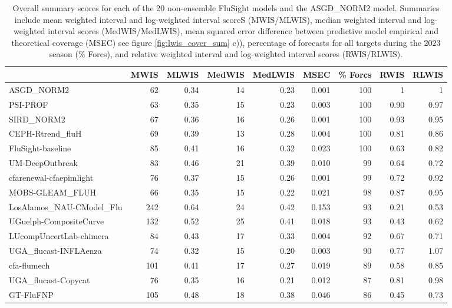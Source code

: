 \begin{table}[ht]
\centering
\begin{adjustwidth}{-3cm}{-1.5cm}
\caption{Overall summary scores for each of the 20 non-ensemble FluSight
models and the ASGD\_NORM2 model. Summaries include mean weighted interval
and log-weighted interval scoreS (MWIS/MLWIS), 
median weighted interval and log-weighted interval scores (MedWIS/MedLWIS), 
mean squared error
difference between predictive model empirical and theoretical coverage (MSEC)
see figure \ref{fig:lwis_cover_sum} c)), percentage of forecasts for all 
targets during the 2023 season (\% Forcs), and relative weighted interval
and log-weighted interval scores (RWIS/RLWIS).}
\begin{tabular}{lrrrrrrrr}
 & MWIS & MLWIS & MedWIS & MedLWIS & MSEC & \% Forcs & RWIS & RLWIS\\ 
  \hline
ASGD\_NORM2 & 62 & 0.34 & 14 & 0.23 & 0.001 & 100 & 1 & 1 \\ 
  PSI-PROF & 63 & 0.35 & 15 & 0.23 & 0.003 & 100 & 0.90 & 0.97 \\ 
  SIRD\_NORM2 & 67 & 0.36 & 16 & 0.26 & 0.001 & 100 & 0.93 & 0.95 \\
  CEPH-Rtrend\_fluH & 69 & 0.39 & 13 & 0.28 & 0.004 & 100 & 0.81 & 0.86 \\ 
  FluSight-baseline & 85 & 0.41 & 16 & 0.32 & 0.023 & 100 & 0.63 & 0.82 \\ 
  UM-DeepOutbreak & 83 & 0.46 & 21 & 0.39 & 0.010 & 99 & 0.64 & 0.72 \\ 
  cfarenewal-cfaepimlight & 76 & 0.37 & 15 & 0.26 & 0.001 & 99 & 0.72 & 0.92 \\ 
  MOBS-GLEAM\_FLUH & 66 & 0.35 & 15 & 0.22 & 0.021 & 98 & 0.87 & 0.95 \\ 
  LosAlamos\_NAU-CModel\_Flu & 242 & 0.64 & 24 & 0.42 & 0.153 & 93 & 0.21 & 0.53 \\ 
  UGuelph-CompositeCurve & 132 & 0.52 & 25 & 0.41 & 0.018 & 93 & 0.43 & 0.62 \\ 
  LUcompUncertLab-chimera & 84 & 0.43 & 17 & 0.33 & 0.004 & 92 & 0.67 & 0.71 \\ 
  UGA\_flucast-INFLAenza & 74 & 0.32 & 15 & 0.20 & 0.003 & 90 & 0.77 & 1.07 \\ 
  cfa-flumech & 101 & 0.41 & 17 & 0.27 & 0.019 & 89 & 0.58 & 0.85 \\ 
  UGA\_flucast-Copycat & 76 & 0.35 & 16 & 0.21 & 0.012 & 87 & 0.81 & 0.98 \\ 
  GT-FluFNP & 105 & 0.48 & 18 & 0.38 & 0.046 & 86 & 0.45 & 0.73 \\ 

\end{tabular}
\end{adjustwidth}
\end{table}
